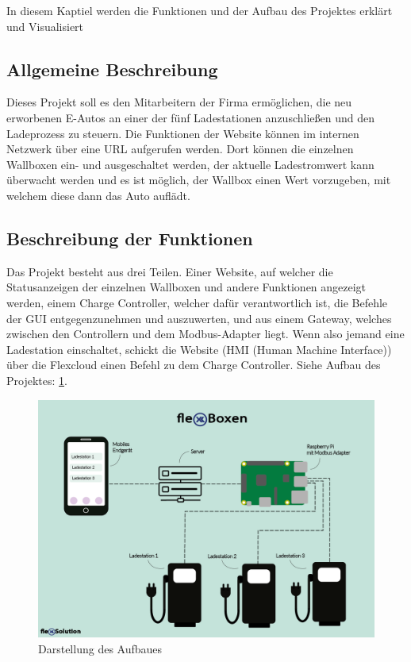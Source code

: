 In diesem Kaptiel werden die Funktionen und der Aufbau des Projektes erklärt und Visualisiert


\subsection{Allgemeine  Beschreibung}

Dieses Projekt soll es den Mitarbeitern der Firma ermöglichen, die neu erworbenen E-Autos an einer der fünf Ladestationen anzuschließen und den Ladeprozess zu steuern. Die Funktionen der Website können im internen Netzwerk über eine URL aufgerufen werden. Dort können die einzelnen Wallboxen ein- und ausgeschaltet werden, der aktuelle Ladestromwert kann überwacht werden und es ist möglich, der Wallbox einen Wert vorzugeben, mit welchem diese dann das Auto auflädt.

\subsection{Beschreibung der Funktionen}  \label{AufbauDesProjektesWallbox}
Das Projekt besteht aus drei Teilen. Einer Website, auf welcher die Statusanzeigen der einzelnen Wallboxen und andere Funktionen angezeigt werden, einem Charge Controller, welcher dafür verantwortlich ist, die Befehle der GUI entgegenzunehmen und auszuwerten, und aus einem Gateway, welches zwischen den Controllern und dem Modbus-Adapter liegt. Wenn also jemand eine Ladestation einschaltet, schickt die Website (HMI (Human Machine Interface)) über die Flexcloud einen Befehl zu dem Charge Controller.
Siehe Aufbau des Projektes: \ref{fig:impl:Infografik_FlexBoxen}.

\begin{figure}[h t]
  \centering
  \includegraphics[scale=0.7]{pics/Infografik_FlexBoxen.png}
  \caption{Darstellung des Aufbaues}
  \label{fig:impl:Infografik_FlexBoxen}
\end{figure}

